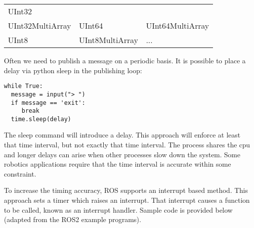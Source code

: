 \begin{longtable}[]{@{}lll@{}}
\begin{minipage}[t]{0.30\columnwidth}
UInt32\strut
\end{minipage}\tabularnewline
\begin{minipage}[t]{0.30\columnwidth}\raggedright
UInt32MultiArray\strut
\end{minipage} & \begin{minipage}[t]{0.30\columnwidth}\raggedright
UInt64\strut
\end{minipage} & \begin{minipage}[t]{0.30\columnwidth}\raggedright
UInt64MultiArray\strut
\end{minipage}\tabularnewline
\begin{minipage}[t]{0.30\columnwidth}\raggedright
UInt8\strut
\end{minipage} & \begin{minipage}[t]{0.30\columnwidth}\raggedright
UInt8MultiArray\strut
\end{minipage} & \begin{minipage}[t]{0.30\columnwidth}\raggedright
...\strut
\end{minipage}\tabularnewline
\bottomrule
\end{longtable}

Often we need to publish a message on a periodic basis. It is possible
to place a delay via python sleep in the publishing loop:

\begin{verbatim}
while True:
  message = input("> ")
  if message == 'exit':
     break
  time.sleep(delay)
\end{verbatim}

The sleep command will introduce a delay. This approach will enforce at
least that time interval, but not exactly that time interval. The
process shares the cpu and longer delays can arise when other processes
slow down the system. Some robotics applications require that the time
interval is accurate within some constraint.

To increase the timing accuracy, ROS supports an interrupt based method.
This approach sets a timer which raises an interrupt. That interrupt
causes a function to be called, known as an interrupt handler. Sample
code is provided below (adapted from the ROS2 example programs).


